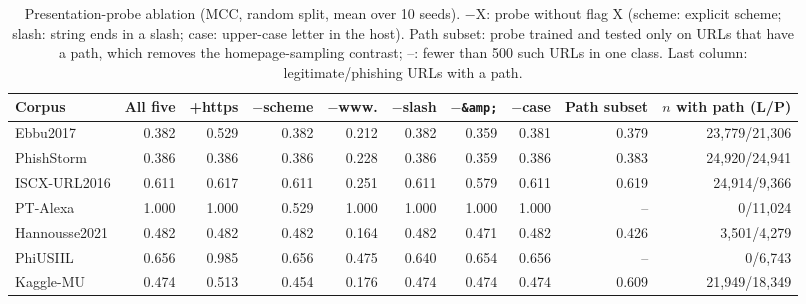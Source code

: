 \begin{table}[tp]
\centering
\caption{Presentation-probe ablation (MCC, random split, mean over 10 seeds). $-$X: probe without flag X (scheme: explicit scheme; slash: string ends in a slash; case: upper-case letter in the host). Path subset: probe trained and tested only on URLs that have a path, which removes the homepage-sampling contrast; --: fewer than 500 such URLs in one class. Last column: legitimate/phishing URLs with a path.}
\label{tab:probe}
\footnotesize
\setlength{\tabcolsep}{3pt}
\begin{adjustbox}{max width=\linewidth}
\begin{tabular}{@{}lrrrrrrrrr@{}}
\toprule
Corpus & All five & +https & $-$scheme & $-$www. & $-$slash & $-$\texttt{\&amp;} & $-$case & Path subset & $n$ with path (L/P) \\
\midrule
Ebbu2017 & 0.382 & 0.529 & 0.382 & 0.212 & 0.382 & 0.359 & 0.381 & 0.379 & 23,779/21,306 \\
PhishStorm & 0.386 & 0.386 & 0.386 & 0.228 & 0.386 & 0.359 & 0.386 & 0.383 & 24,920/24,941 \\
ISCX-URL2016 & 0.611 & 0.617 & 0.611 & 0.251 & 0.611 & 0.579 & 0.611 & 0.619 & 24,914/9,366 \\
PT-Alexa & 1.000 & 1.000 & 0.529 & 1.000 & 1.000 & 1.000 & 1.000 & -- & 0/11,024 \\
Hannousse2021 & 0.482 & 0.482 & 0.482 & 0.164 & 0.482 & 0.471 & 0.482 & 0.426 & 3,501/4,279 \\
PhiUSIIL & 0.656 & 0.985 & 0.656 & 0.475 & 0.640 & 0.654 & 0.656 & -- & 0/6,743 \\
Kaggle-MU & 0.474 & 0.513 & 0.454 & 0.176 & 0.474 & 0.474 & 0.474 & 0.609 & 21,949/18,349 \\
\bottomrule
\end{tabular}
\end{adjustbox}
\end{table}
